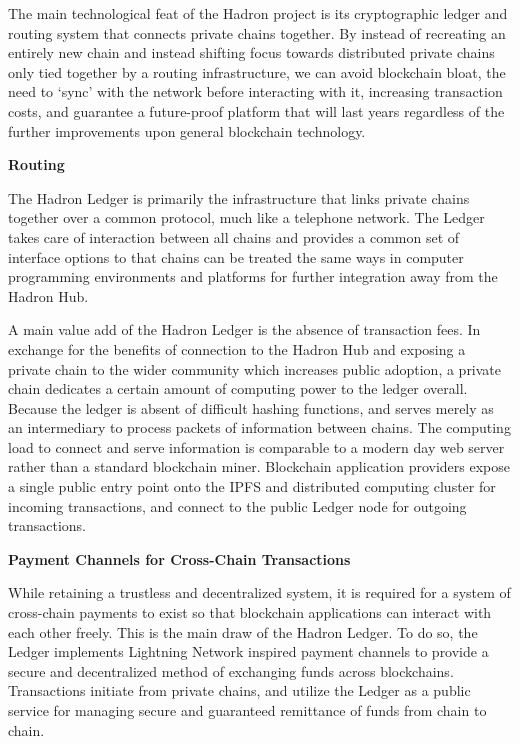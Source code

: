\documentclass{%
	article}
\begin{document}
The main technological feat of the Hadron project is its cryptographic ledger and routing system that connects private chains together. By instead of recreating an entirely new chain and instead shifting focus towards distributed private chains only tied together by a routing infrastructure, we can avoid blockchain bloat, the need to ‘sync’ with the network before interacting with it, increasing transaction costs, and guarantee a future-proof platform that will last years regardless of the further improvements upon general blockchain technology.

\begin{center}
\textbf{Routing}
\end{center}

The Hadron Ledger is primarily the infrastructure that links private chains together over a common protocol, much like a telephone network. The Ledger takes care of interaction between all chains and provides a common set of interface options to that chains can be treated the same ways in computer programming environments and platforms for further integration away from the Hadron Hub.

A main value add of the Hadron Ledger is the absence of transaction fees. In exchange for the benefits of connection to the Hadron Hub and exposing a private chain to the wider community which increases public adoption, a private chain dedicates a certain amount of computing power to the ledger overall. Because the ledger is absent of difficult hashing functions, and serves merely as an intermediary to process packets of information between chains. The computing load to connect and serve information is comparable to a modern day web server rather than a standard blockchain miner\cite{bigchaindb}. Blockchain application providers expose a single public entry point onto the IPFS and distributed computing cluster for incoming transactions, and connect to the public Ledger node for outgoing transactions.

\begin{center}
\textbf{Payment Channels for Cross-Chain Transactions}
\end{center}

While retaining a trustless and decentralized system, it is required for a system of cross-chain payments to exist so that blockchain applications can interact with each other freely. This is the main draw of the Hadron Ledger. To do so, the Ledger implements Lightning Network\cite{lightning} inspired payment channels to provide a secure and decentralized method of exchanging funds across blockchains. Transactions initiate from private chains, and utilize the Ledger as a public service for managing secure and guaranteed remittance of funds from chain to chain.
\end{document}
